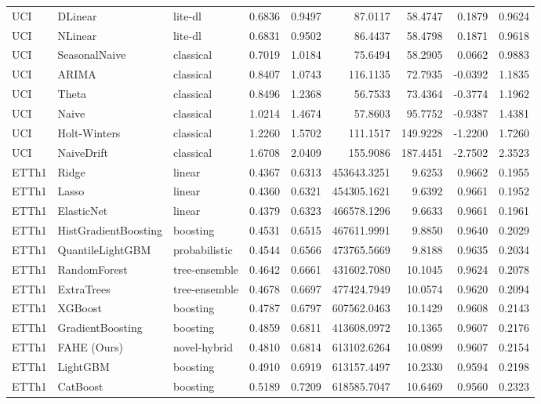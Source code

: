 \begin{tabular}{lllrrrrrr}
UCI & DLinear & lite-dl & 0.6836 & 0.9497 & 87.0117 & 58.4747 & 0.1879 & 0.9624 \\
UCI & NLinear & lite-dl & 0.6831 & 0.9502 & 86.4437 & 58.4798 & 0.1871 & 0.9618 \\
UCI & SeasonalNaive & classical & 0.7019 & 1.0184 & 75.6494 & 58.2905 & 0.0662 & 0.9883 \\
UCI & ARIMA & classical & 0.8407 & 1.0743 & 116.1135 & 72.7935 & -0.0392 & 1.1835 \\
UCI & Theta & classical & 0.8496 & 1.2368 & 56.7533 & 73.4364 & -0.3774 & 1.1962 \\
UCI & Naive & classical & 1.0214 & 1.4674 & 57.8603 & 95.7752 & -0.9387 & 1.4381 \\
UCI & Holt-Winters & classical & 1.2260 & 1.5702 & 111.1517 & 149.9228 & -1.2200 & 1.7260 \\
UCI & NaiveDrift & classical & 1.6708 & 2.0409 & 155.9086 & 187.4451 & -2.7502 & 2.3523 \\
ETTh1 & Ridge & linear & 0.4367 & 0.6313 & 453643.3251 & 9.6253 & 0.9662 & 0.1955 \\
ETTh1 & Lasso & linear & 0.4360 & 0.6321 & 454305.1621 & 9.6392 & 0.9661 & 0.1952 \\
ETTh1 & ElasticNet & linear & 0.4379 & 0.6323 & 466578.1296 & 9.6633 & 0.9661 & 0.1961 \\
ETTh1 & HistGradientBoosting & boosting & 0.4531 & 0.6515 & 467611.9991 & 9.8850 & 0.9640 & 0.2029 \\
ETTh1 & QuantileLightGBM & probabilistic & 0.4544 & 0.6566 & 473765.5669 & 9.8188 & 0.9635 & 0.2034 \\
ETTh1 & RandomForest & tree-ensemble & 0.4642 & 0.6661 & 431602.7080 & 10.1045 & 0.9624 & 0.2078 \\
ETTh1 & ExtraTrees & tree-ensemble & 0.4678 & 0.6697 & 477424.7949 & 10.0574 & 0.9620 & 0.2094 \\
ETTh1 & XGBoost & boosting & 0.4787 & 0.6797 & 607562.0463 & 10.1429 & 0.9608 & 0.2143 \\
ETTh1 & GradientBoosting & boosting & 0.4859 & 0.6811 & 413608.0972 & 10.1365 & 0.9607 & 0.2176 \\
ETTh1 & FAHE (Ours) & novel-hybrid & 0.4810 & 0.6814 & 613102.6264 & 10.0899 & 0.9607 & 0.2154 \\
ETTh1 & LightGBM & boosting & 0.4910 & 0.6919 & 613157.4497 & 10.2330 & 0.9594 & 0.2198 \\
ETTh1 & CatBoost & boosting & 0.5189 & 0.7209 & 618585.7047 & 10.6469 & 0.9560 & 0.2323 \\

\end{tabular}
